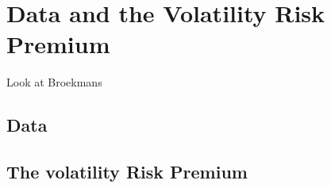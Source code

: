 \section{Data and the Volatility Risk Premium}

Look at Broekmans

\subsection{Data}

\subsection{The volatility Risk Premium}


